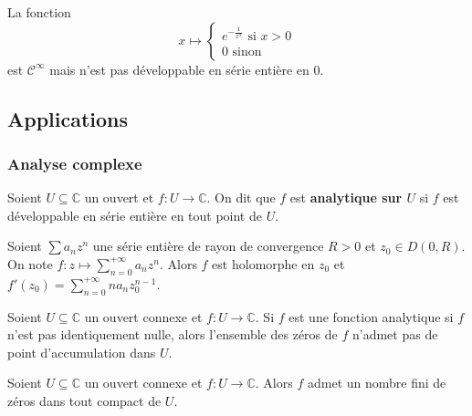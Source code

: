 
  \begin{cexample}
    La fonction
    \[
    x \mapsto \begin{cases}
      e^{-\frac{1}{x^2}} \text{ si } x > 0 \\
      0 \text{ sinon}
    \end{cases}
    \]
    est $\mathcal{C}^\infty$ mais n'est pas développable en série entière en $0$.
  \end{cexample}

  \subsection{Applications}

  \subsubsection{Analyse complexe}


  \begin{definition}
    Soient $U \subseteq \mathbb{C}$ un ouvert et $f : U \rightarrow \mathbb{C}$. On dit que $f$ est \textbf{analytique sur $U$} si $f$ est développable en série entière en tout point de $U$.
  \end{definition}

  \begin{theorem}
    Soient $\sum a_n z^n$ une série entière de rayon de convergence $R > 0$ et $z_0 \in D(0,R)$. On note $f : z \mapsto \sum_{n=0}^{+\infty} a_n z^n$.
    Alors $f$ est holomorphe en $z_0$ et $f'(z_0) = \sum_{n=0}^{+\infty} n a_n z_0^{n-1}$.
  \end{theorem}

  \begin{theorem}
    Soient $U \subseteq \mathbb{C}$ un ouvert connexe et $f : U \rightarrow \mathbb{C}$. Si $f$ est une fonction analytique si $f$ n'est pas identiquement nulle, alors l'ensemble des zéros de $f$ n'admet pas de point d'accumulation dans $U$.
  \end{theorem}

  \begin{corollary}
    Soient $U \subseteq \mathbb{C}$ un ouvert connexe et $f : U \rightarrow \mathbb{C}$. Alors $f$ admet un nombre fini de zéros dans tout compact de $U$.
  \end{corollary}



